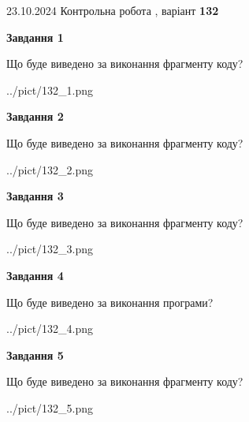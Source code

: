 \documentclass[12pt, ukrainian]{article}
\begin{document}
{\Large{23.10.2024 Контрольна робота , варіант  \No \textbf { 132 }\par}}
{
\begin {large}
{\begin {center}\textbf{Завдання 1}\end {center}}

Що буде виведено за виконання фрагменту коду?\par
\begin{center}
	{../pict/132_1.png}
\end{center}
\newpage

{\begin {center}\textbf{Завдання 2}\end {center}}

Що буде виведено за виконання фрагменту коду?\par
\begin{center}
	{../pict/132_2.png}
\end{center}
\newpage

{\begin {center}\textbf{Завдання 3}\end {center}}

Що буде виведено за виконання фрагменту коду?\par
\begin{center}
	{../pict/132_3.png}
\end{center}
\newpage

{\begin {center}\textbf{Завдання 4}\end {center}}

Що буде виведено за виконання програми?\par
\begin{center}
	{../pict/132_4.png}
\end{center}
\newpage

{\begin {center}\textbf{Завдання 5}\end {center}}

Що буде виведено за виконання фрагменту коду?\par
\begin{center}
	{../pict/132_5.png}
\end{center}
\newpage


\end{large}}
\end{document}
